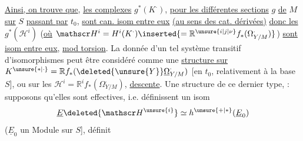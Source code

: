 \uline{Ainsi, on trouve que},  \uline{les complexes} $g^*(K^{\cdot})$, \uline{pour les différentes sections} $g$ \uline{de} $M$ \uline{sur} $S$ \uline{passant par} $t_0$, \uline{sont can. isom entre eux} \uline{(au sens des cat. dérivées)} \uline{donc les} $g^*(\mathscr H^i)$ (\uline{où} $\mathscr H^i=H^i(K^{\cdot})\inserted{=\mathbb R^{\unsure{i|j|\nu}}f_*(\Omega^{\cdot}_{Y/M})}$) \uline{sont  isom entre eux},  \uline{mod torsion}. La donnée d'un tel système transitif d'isomorphismes peut être considéré comme une \uline{structure  sur} $K^{\unsure{*|\cdot}}=\mathbb R f_*(\deleted{\unsure{Y}}\underline{\Omega}^{\cdot}_{Y/M})$ [en  $t_0$, relativement à la base $S$], ou sur les $\mathscr H^i=\mathbb R^i f_*(\Omega^{\cdot}_{Y/M})$,   \uline{descente}. Une structure de  ce dernier type,  : supposons qu'elles sont effectives, i.e. définissent un isom
\[
\underline E\deleted{\mathscr H^{\unsure{i}}}\simeq h^{\unsure{+|*}}(\underline E_0)
\]
($\underline E_0$ un Module sur $S$], définit 


